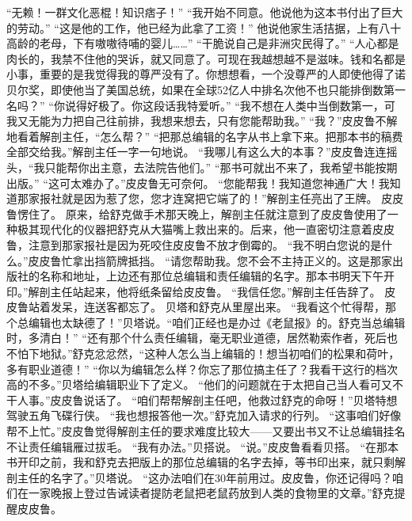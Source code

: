 \documentclass[a4paper,12pt,UTF8,twoside]{ctexbook}
\begin{document}
        “无赖！一群文化恶棍！知识痞子！” 
        “我开始不同意。他说他为这本书付出了巨大的劳动。” 
        “这是他的工作，他已经为此拿了工资！” 
        他说他家生活拮据，上有八十高龄的老母，下有嗷嗷待哺的婴儿……” 
        “干脆说自己是非洲灾民得了。” 
        “人心都是肉长的，我禁不住他的哭诉，就又同意了。可现在我越想越不是滋味。钱和名都是小事，重要的是我觉得我的尊严没有了。你想想看，一个没尊严的人即使他得了诺贝尔奖，即使他当了美国总统，如果在全球52亿人中排名次他不也只能排倒数第一名吗？” 
        “你说得好极了。你这段话我特爱听。” 
        “我不想在人类中当倒数第一，可我又无能为力把自己往前排，我想来想去，只有您能帮助我。” 
        “我？”皮皮鲁不解地看着解剖主任，“怎么帮？” 
        “把那总编辑的名字从书上拿下来。把那本书的稿费全部交给我。”解剖主任一字一句地说。 
        “我哪儿有这么大的本事？”皮皮鲁连连摇头，“我只能帮你出主意，去法院告他们。” 
        “那书可就出不来了，我希望书能按期出版。” 
        “这可太难办了。”皮皮鲁无可奈何。 
        “您能帮我！我知道您神通广大！我知道那家报社就是因为惹了您，您才连窝把它端了的！”解剖主任亮出了王牌。 
        皮皮鲁愣住了。 
        原来，给舒克做手术那天晚上，解剖主任就注意到了皮皮鲁使用了一种极其现代化的仪器把舒克从大猫嘴上救出来的。后来，他一直密切注意着皮皮鲁，注意到那家报社是因为死咬住皮皮鲁不放才倒霉的。 
        “我不明白您说的是什么。”皮皮鲁忙拿出挡箭牌抵挡。 
        “请您帮助我。您不会不主持正义的。这是那家出版社的名称和地址，上边还有那位总编辑和责任编辑的名字。那本书明天下午开印。”解剖主任站起来，他将纸条留给皮皮鲁。 
        “我信任您。”解剖主任告辞了。 
        皮皮鲁站着发呆，连送客都忘了。 
        贝塔和舒克从里屋出来。 
        “我看这个忙得帮，那个总编辑也太缺德了！”贝塔说。“咱们正经也是办过《老鼠报》的。舒克当总编辑时，多清白！” 
        “还有那个什么责任编辑，毫无职业道德，居然勒索作者，死后也不怕下地狱。”舒克忿忿然，“这种人怎么当上编辑的！想当初咱们的松果和荷叶，多有职业道德！” 
        “你以为编辑怎么样？你忘了那位搞主任了？我看干这行的档次高的不多。”贝塔给编辑职业下了定义。 
        “他们的问题就在于太把自己当人看可又不干人事。”皮皮鲁说话了。 
        “咱们帮帮解剖主任吧，他救过舒克的命呀！”贝塔特想驾驶五角飞碟行侠。 
        “我也想报答他一次。”舒克加入请求的行列。 
        “这事咱们好像帮不上忙。”皮皮鲁觉得解剖主任的要求难度比较大——又要出书又不让总编辑挂名不让责任编辑雁过拔毛。 
        “我有办法。”贝搭说。 
        “说。”皮皮鲁看看贝搭。 
        “在那本书开印之前，我和舒克去把版上的那位总编辑的名字去掉，等书印出来，就只剩解剖主任的名字了。”贝塔说。 
        “这办法咱们在30年前用过。皮皮鲁，你还记得吗？咱们在一家晚报上登过告诫读者提防老鼠把老鼠药放到人类的食物里的文章。”舒克提醒皮皮鲁。 
\end{document}
